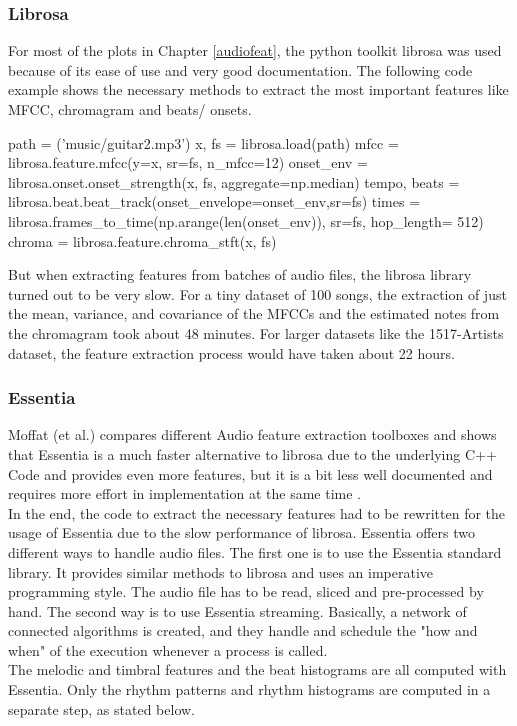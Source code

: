 \subsubsection{Librosa}

For most of the plots in Chapter \ref{audiofeat}, the python toolkit librosa was used because of its ease of use and very good documentation. The following code example shows the necessary methods to extract the most important features like MFCC, chromagram and beats/ onsets.
\lstset{language=Python} 
\begin{pythonCode}[frame=single,label={lst:librosa},caption={librosa},captionpos=b]
path = ('music/guitar2.mp3')
x, fs = librosa.load(path)
mfcc = librosa.feature.mfcc(y=x, sr=fs, n_mfcc=12)
onset_env = librosa.onset.onset_strength(x, fs, aggregate=np.median)
tempo, beats = librosa.beat.beat_track(onset_envelope=onset_env,sr=fs)
times = librosa.frames_to_time(np.arange(len(onset_env)), sr=fs, hop_length= 512)
chroma = librosa.feature.chroma_stft(x, fs)
\end{pythonCode}	
But when extracting features from batches of audio files, the librosa library turned out to be very slow. For a tiny dataset of 100 songs, the extraction of just the mean, variance, and covariance of the MFCCs and the estimated notes from the chromagram took about 48 minutes. 
For larger datasets like the 1517-Artists dataset, the feature extraction process would have taken about 22 hours. 

\subsubsection{Essentia}

Moffat (et al.) compares different Audio feature extraction toolboxes and shows that Essentia is a much faster alternative to librosa due to the underlying C++ Code and provides even more features, but it is a bit less well documented and requires more effort in implementation at the same time \cite{audiofeattoolb}.\\ 
In the end, the code to extract the necessary features had to be rewritten for the usage of Essentia due to the slow performance of librosa. Essentia offers two different ways to handle audio files. The first one is to use the Essentia standard library. It provides similar methods to librosa and uses an imperative programming style. The audio file has to be read, sliced and pre-processed by hand. The second way is to use Essentia streaming. Basically, a network of connected algorithms is created, and they handle and schedule the "how and when" of the execution whenever a process is called. \\
The melodic and timbral features and the beat histograms are all computed with Essentia. Only the rhythm patterns and rhythm histograms are computed in a separate step, as stated below. 

